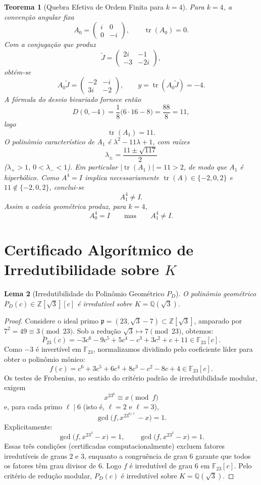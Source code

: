 \documentclass[11pt,a4paper]{article}
\newtheorem{teorema}{Teorema}
\newtheorem{lema}[teorema]{Lema}
\begin{document}
\begin{teorema}[Quebra Efetiva de Ordem Finita para $k=4$]
Para $k=4$, a convenção angular fixa
\[
A_0=\begin{pmatrix}i&0\\0&-i\end{pmatrix},\qquad\operatorname{tr}(A_0)=0.
\]
Com a conjugação que produz
\[
\widetilde{J}=\begin{pmatrix}2i&-1\\-3&-2i\end{pmatrix},
\]
obtém-se
\[
A_0\widetilde{J}=\begin{pmatrix}-2&-i\\3i&-2\end{pmatrix},\qquad
y=\operatorname{tr}(A_0\widetilde{J})=-4.
\]
A fórmula do desvio bivariado fornece então
\[
D(0,-4)=\frac18\bigl(6\cdot16-8\bigr)=\frac{88}{8}=11,
\]
logo
\[
\operatorname{tr}(A_1)=11.
\]
O polinômio característico de \(A_1\) é \(\lambda^2-11\lambda+1\), com raízes
\[
\lambda_\pm=\frac{11\pm\sqrt{117}}2
\]
(\(\lambda_+>1\), \(0<\lambda_-<1\)). Em particular \(\lvert\operatorname{tr}(A_1)\rvert=11>2\), de modo que \(A_1\) é hiperbólico. Como \(A^4=I\) implica necessariamente \(\operatorname{tr}(A)\in\{-2,0,2\}\) e \(11\notin\{-2,0,2\}\), conclui-se
\[
A_1^4\neq I.
\]
Assim a cadeia geométrica produz, para \(k=4\),
\[
A_0^4=I\qquad\text{mas}\qquad A_1^4\neq I.
\]
\end{teorema}

\section{Certificado Algorítmico de Irredutibilidade sobre \texorpdfstring{$K$}{K}}

\begin{lema}[Irredutibilidade do Polinômio Geométrico $P_D$]
O polinômio geométrico $P_D(c) \in \mathbb{Z}[\sqrt{3}][c]$ é irredutível sobre $K = \mathbb{Q}(\sqrt{3})$.
\end{lema}

\begin{proof}
Considere o ideal primo $\mathfrak{p} = (23, \sqrt{3} - 7) \subset \mathbb{Z}[\sqrt{3}]$, amparado por $7^2 = 49 \equiv 3 \pmod{23}$.
Sob a redução $\sqrt{3} \mapsto 7 \pmod{23}$, obtemos:
\[
\bar{P}_{23}(c) = -3c^6 - 9c^5 + 5c^4 - c^3 + 3c^2 + c + 11 \in \mathbb{F}_{23}[c].
\]
Como $-3$ é invertível em $\mathbb{F}_{23}$, normalizamos dividindo pelo coeficiente líder para obter o polinômio mônico:
\[
f(c) = c^6 + 3c^5 + 6c^4 + 8c^3 - c^2 - 8c + 4 \in \mathbb{F}_{23}[c].
\]
Os testes de Frobenius, no sentido do critério padrão de irredutibilidade modular, exigem
\[
x^{23^6}\equiv x\pmod{f}
\]
e, para cada primo $\ell\mid 6$ (isto é, $\ell=2$ e $\ell=3$),
\[
\gcd\bigl(f,x^{23^{6/\ell}}-x\bigr)=1.
\]
Explicitamente:
\[
\gcd\bigl(f,x^{23^3}-x\bigr)=1, \qquad \gcd\bigl(f,x^{23^2}-x\bigr)=1.
\]
Essas três condições (certificadas computacionalmente) excluem fatores irredutíveis de graus $2$ e $3$, enquanto a congruência de grau $6$ garante que todos os fatores têm grau divisor de $6$. Logo $f$ é irredutível de grau $6$ em $\mathbb{F}_{23}[c]$. Pelo critério de redução modular, $P_D(c)$ é irredutível sobre $K = \mathbb{Q}(\sqrt{3})$.
\end{proof}
\end{document}
